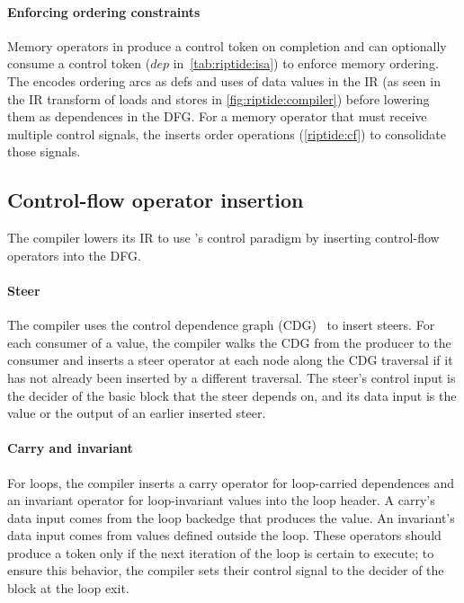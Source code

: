 \paragraph{Enforcing ordering constraints} 
Memory operators in \riptide 
produce a control token on completion and can optionally consume a
control token ($dep$ in~\autoref{tab:riptide:isa}) to enforce memory ordering.
%
The \mend encodes ordering arcs as defs and uses of data values in the IR
(as seen in the IR transform of loads and stores in \autoref{fig:riptide:compiler})
before lowering them as dependences in the DFG.
%
For a memory operator that must receive multiple control signals,
the \mend inserts order operations (\autoref{riptide:cf}) to consolidate those signals.

\subsection{Control-flow operator insertion}

The compiler lowers its IR to use \riptide's control paradigm by inserting \riptide
control-flow operators into the DFG.
%

\paragraph{Steer}
%
The compiler uses the control dependence graph (CDG)~\cite{cytron} to 
insert steers.
%
For each consumer of a value, the compiler walks the CDG from the producer
to the consumer
and inserts a steer operator at
each node along the CDG traversal if it has not already been inserted by a different traversal. 
%
% 
The steer's control input is the decider of the basic block that the steer depends on,
and its data input is the value or the output of an earlier inserted steer.
%

\paragraph{Carry and invariant}
%
For loops, the compiler inserts a carry operator for loop-carried dependences
and an invariant operator for loop-invariant values
into the loop header.
%
A carry's data
input comes from the loop backedge that produces the value.  An invariant's
data input comes from values defined outside the loop.
%
These operators should produce a token only if the next iteration of the loop is
certain to execute; to ensure this behavior, the compiler sets their control
signal to the decider of the block at the loop exit. 
%

